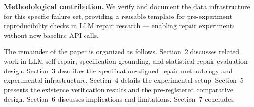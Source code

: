 \textbf{Methodological contribution.} We verify and document the data infrastructure for
this specific failure set, providing a reusable template for pre-experiment
reproducibility checks in LLM repair research --- enabling repair experiments
without new baseline API calls.

The remainder of the paper is organized as follows. Section~2 discusses related work
in LLM self-repair, specification grounding, and statistical repair evaluation design.
Section~3 describes the specification-aligned repair methodology and experimental
infrastructure. Section~4 details the experimental setup. Section~5 presents the
existence verification results and the pre-registered comparative design. Section~6
discusses implications and limitations. Section~7 concludes.
